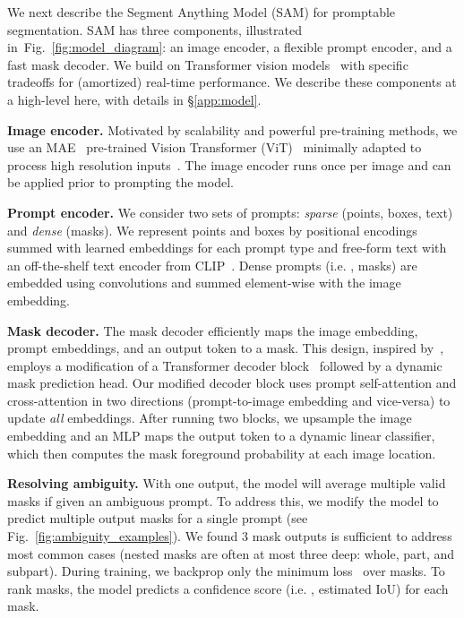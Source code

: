 We next describe the Segment Anything Model (SAM) for promptable segmentation. SAM has three components, illustrated in~Fig.~\ref{fig:model_diagram}: an image encoder, a flexible prompt encoder, and a fast mask decoder. We build on Transformer vision models~\cite{Carion2020,Dosovitskiy2021,cheng2021per,li2022exploring} with specific tradeoffs for (amortized) real-time performance. We describe these components at a high-level here, with details in \S\ref{app:model}.

\textbf{Image encoder.} Motivated by scalability and powerful pre-training methods, we use an MAE~\cite{he2022masked} pre-trained Vision Transformer (ViT)~\cite{Dosovitskiy2021} minimally adapted to process high resolution inputs~\cite{li2022exploring}. The image encoder runs once per image and can be applied prior to prompting the model.

\textbf{Prompt encoder.} We consider two sets of prompts: \emph{sparse} (points, boxes, text) and \emph{dense} (masks). We represent points and boxes by positional encodings~\cite{tancik2020fourier} summed with learned embeddings for each prompt type and free-form text with an off-the-shelf text encoder from CLIP~\cite{Radford2021}. Dense prompts (i.e. , masks) are embedded using convolutions and summed element-wise with the image embedding.

\textbf{Mask decoder.} The mask decoder efficiently maps the image embedding, prompt embeddings, and an output token to a mask. This design, inspired by~\cite{Carion2020,cheng2021per}, employs a modification of a Transformer decoder block~\cite{Vaswani2017} followed by a dynamic mask prediction head. Our modified decoder block uses prompt self-attention and cross-attention in two directions (prompt-to-image embedding and vice-versa) to update \emph{all} embeddings. After running two blocks, we upsample the image embedding and an MLP maps the output token to a dynamic linear classifier, which then computes the mask foreground probability at each image location.

\textbf{Resolving ambiguity.} With one output, the model will average multiple valid masks if given an ambiguous prompt. To address this, we modify the model to predict multiple output masks for a single prompt (see Fig.~\ref{fig:ambiguity_examples}). We found 3 mask outputs is sufficient to address most common cases (nested masks are often at most three deep: whole, part, and subpart). During training, we backprop only the minimum loss~\cite{charpiat2008automatic,guzman2012multiple,li2018interactive} over masks. To rank masks, the model predicts a confidence score (i.e. , estimated IoU) for each mask.

